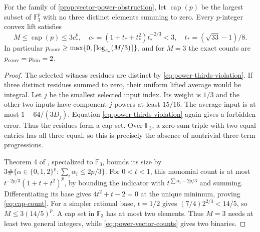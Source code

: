 \begin{proposition}\label{prop:cap-set}
For the family of \cref{prop:vector-power-obstruction}, let
$\operatorname{cap}(p)$ be the largest subset of $\mathbb F_3^p$ with
no three distinct elements summing to zero. Every $p$-integer convex
lift satisfies
\begin{equation}\label{eq:cap-count}
 M\le\operatorname{cap}(p)\le3c_*^p,
 \quad c_*=(1+t_*+t_*^2)t_*^{-2/3}<3,
 \quad t_*=(\sqrt{33}-1)/8.
\end{equation}
In particular $p_{\mathrm{conv}}\ge\max\{0,\lceil\log_{c_*}(M/3)\rceil\}$,
and for $M=3$ the exact counts are $p_{\mathrm{conv}}=p_{\mathrm{bin}}=2$.
\end{proposition}
\begin{proof}
The selected witness residues are distinct by
\eqref{eq:power-thirds-violation}. If three distinct residues summed
to zero, their uniform lifted average would be integral. Let $j$ be
the smallest selected input index. Its weight is $1/3$ and the other
two inputs have component-$j$ powers at least $15/16$. The average
input is at most $1-64/(3D_j)$. Equation
\eqref{eq:power-thirds-violation} again gives a forbidden error.
Thus the residues form a cap set. Over $\mathbb F_3$, a zero-sum
triple with two equal entries has all three equal, so this is precisely
the absence of nontrivial three-term progressions.

Theorem 4 of \citet{ellenberg2017}, specialized to $\mathbb F_3$,
bounds its size by
$3\#\{\alpha\in\{0,1,2\}^p:\sum_i\alpha_i\le2p/3\}$.
For $0<t<1$, this monomial count is at most
$t^{-2p/3}(1+t+t^2)^p$, by bounding the indicator with
$t^{\sum\alpha_i-2p/3}$ and summing. Differentiating its base gives
$4t^2+t-2=0$ at the unique minimum, proving \eqref{eq:cap-count}.
For a simpler rational base, $t=1/2$ gives
$(7/4)2^{2/3}<14/5$, so $M\le3(14/5)^p$.
A cap set in $\mathbb F_3$ has at most two elements. Thus $M=3$
needs at least two general integers, while
\eqref{eq:power-vector-counts} gives two binaries.
\end{proof}

